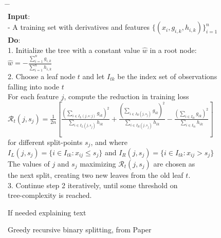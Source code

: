 \begin{algorithm*}[h!]
	\begin{tabbing}
		\hspace{2em} \= \hspace{2em} \= \hspace{2em} \= \\
		{\bfseries Input}: \\
		\> - A training set with derivatives and features $\{(x_i, g_{i,k}, h_{i,k})\}_{i=1}^n$\\
		
		{\bfseries Do}: \\
		1. Initialize the tree with a constant value $\hat{w}$ in a root node:\\
		\>	$\hat{w} = - \frac{\sum_{i=1}^{n}g_{i,k}}{\sum_{i=1}^{n}h_{i,k}}$\\
		
		2. Choose a leaf node $t$ and let $I_{tk}$ be the index set of observations\\
		\> falling into node $t$\\ 
		\> For each feature $j$, compute the reduction in training loss\\
		\> $ \mathcal{R}_t(j,s_j)=\frac{1}{2n}\left[ \frac{\left(\sum_{i\in I_{L}(j,s:j)}g_{ik}\right)^2}{\sum_{i\in I_{L}(j,s_j)}h_{ik}}
		+ \frac{\left(\sum_{i\in I_{R}(j,s_j)}g_{ik}\right)^2}{\sum_{i\in I_{R}(j,s_j)}h_{ik}}	
		-\frac{\left(\sum_{i\in I_{tk}}g_{ik}\right)^2}{\sum_{i\in I_{tk}}h_{ik}} \right] $\\
		\> 		for different split-points $s_j$, and where\\ 
		\> $I_{L}(j,s_j) = \{ i\in I_{tk}: x_{ij}\leq s_j \}$ and
		 $I_{R}(j, s_j) = \{ i\in I_{tk} : x_{ij} > s_j \}$\\
		\> The values of $j$ and $s_j$ maximizing $\mathcal R_t(j,s_j)$ are chosen as\\
		\> the next split, creating two new leaves from the old leaf $t$.\\
		
		3. Continue step 2 iteratively, until some threshold on\\
		\> tree-complexity is reached.
		
	\end{tabbing}
	
	\vspace{0.5cm}
	If needed explaining text
	\vspace{0.5cm}
	
	\caption{\label{alg:recursive-binary-splitting} Greedy recursive binary splitting, from Paper  }
\end{algorithm*}

